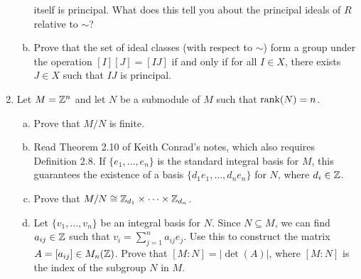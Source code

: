\begin{enumerate}[leftmargin=1.5cm, label={{\bf A2-\arabic*}}]
\begin{enumerate}[(a)]
        itself is principal. What does this tell you about the principal 
        ideals of $R$ relative to $\sim$?
        \item Prove that the set of ideal classes (with respect to $\sim$) form a 
        group under the operation $[I][J] = [IJ]$ if and only if for all 
        $I \in X$, there exists $J \in X$ such that $IJ$ is principal.
    \end{enumerate} 
    \item \label{A2-4} Let $M = \mathbb{Z}^n$ and let $N$ be a submodule of $M$ such that $\operatorname{rank}(N) = n$. 
    \begin{enumerate}[(a)]
        \item Prove that $M/N$ is finite. 
        \item Read Theorem 2.10 of Keith Conrad's notes, which also 
        requires Definition 2.8. If $\{e_1, \dots, e_n\}$ is 
        the standard integral basis for $M$, this guarantees the existence of a 
        basis $\{d_1e_1, \dots, d_ne_n\}$ for $N$, where $d_i \in \mathbb{Z}$. 
        \item Prove that $M/N \cong \mathbb{Z}_{d_1} \times \cdots \times \mathbb{Z}_{d_n}$. 
        \item Let $\{v_1, \dots, v_n\}$ be an integral basis for $N$. 
        Since $N \subseteq M$, we can find $a_{ij} \in \mathbb{Z}$ such that 
        $v_i = \sum_{j=1}^n a_{ij} e_j$. Use this to construct the matrix 
        $A = [a_{ij}] \in M_n(\mathbb{Z})$. Prove that $[M : N] = \lvert\det(A)\rvert$, where 
        $[M : N]$ is the index of the subgroup $N$ in $M$.
    \end{enumerate}
\end{enumerate}
